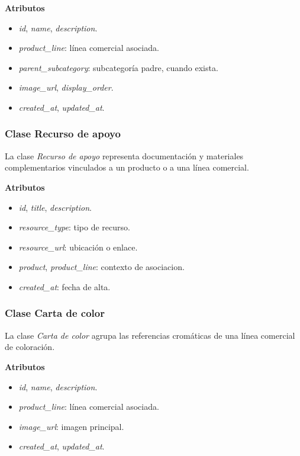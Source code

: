 \textbf{Atributos}

\begin{itemize}
      \item \textit{id}, \textit{name}, \textit{description}.
      \item \textit{product\_line}: línea comercial asociada.
      \item \textit{parent\_subcategory}: subcategoría padre, cuando exista.
      \item \textit{image\_url}, \textit{display\_order}.
      \item \textit{created\_at}, \textit{updated\_at}.
\end{itemize}

\subsubsection{Clase Recurso de apoyo}

La clase \textit{Recurso de apoyo} representa documentación y materiales complementarios vinculados a un producto o a una línea comercial.

\textbf{Atributos}

\begin{itemize}
      \item \textit{id}, \textit{title}, \textit{description}.
      \item \textit{resource\_type}: tipo de recurso.
      \item \textit{resource\_url}: ubicación o enlace.
      \item \textit{product}, \textit{product\_line}: contexto de asociacion.
      \item \textit{created\_at}: fecha de alta.
\end{itemize}

\subsubsection{Clase Carta de color}

La clase \textit{Carta de color} agrupa las referencias cromáticas de una línea comercial de coloración.

\textbf{Atributos}

\begin{itemize}
      \item \textit{id}, \textit{name}, \textit{description}.
      \item \textit{product\_line}: línea comercial asociada.
      \item \textit{image\_url}: imagen principal.
      \item \textit{created\_at}, \textit{updated\_at}.
\end{itemize}

